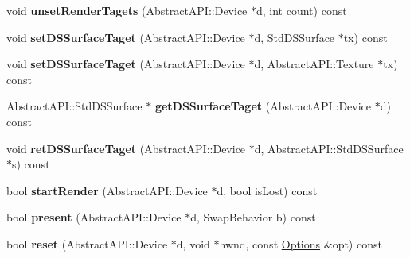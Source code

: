 \begin{DoxyCompactItemize}
\item 
\hypertarget{class_tempest_1_1_direct_x9_a0de8c9bc2b57107919436b5ede1e86af}{void {\bfseries unset\+Render\+Tagets} (Abstract\+A\+P\+I\+::\+Device $\ast$d, int count) const }\label{class_tempest_1_1_direct_x9_a0de8c9bc2b57107919436b5ede1e86af}

\item 
\hypertarget{class_tempest_1_1_direct_x9_a22ad8d6d5d3a21ca2bfee5fac260140a}{void {\bfseries set\+D\+S\+Surface\+Taget} (Abstract\+A\+P\+I\+::\+Device $\ast$d, Std\+D\+S\+Surface $\ast$tx) const }\label{class_tempest_1_1_direct_x9_a22ad8d6d5d3a21ca2bfee5fac260140a}

\item 
\hypertarget{class_tempest_1_1_direct_x9_a66e60b211e993e9d5f811d0f33075670}{void {\bfseries set\+D\+S\+Surface\+Taget} (Abstract\+A\+P\+I\+::\+Device $\ast$d, Abstract\+A\+P\+I\+::\+Texture $\ast$tx) const }\label{class_tempest_1_1_direct_x9_a66e60b211e993e9d5f811d0f33075670}

\item 
\hypertarget{class_tempest_1_1_direct_x9_a2a15e9532b6a146569ddcc99e142b5ab}{Abstract\+A\+P\+I\+::\+Std\+D\+S\+Surface $\ast$ {\bfseries get\+D\+S\+Surface\+Taget} (Abstract\+A\+P\+I\+::\+Device $\ast$d) const }\label{class_tempest_1_1_direct_x9_a2a15e9532b6a146569ddcc99e142b5ab}

\item 
\hypertarget{class_tempest_1_1_direct_x9_ad3fe197c12fdc09ce025df3a066cb39b}{void {\bfseries ret\+D\+S\+Surface\+Taget} (Abstract\+A\+P\+I\+::\+Device $\ast$d, Abstract\+A\+P\+I\+::\+Std\+D\+S\+Surface $\ast$s) const }\label{class_tempest_1_1_direct_x9_ad3fe197c12fdc09ce025df3a066cb39b}

\item 
\hypertarget{class_tempest_1_1_direct_x9_af68144c80b9527f9f100ddf83dfcd8e4}{bool {\bfseries start\+Render} (Abstract\+A\+P\+I\+::\+Device $\ast$d, bool is\+Lost) const }\label{class_tempest_1_1_direct_x9_af68144c80b9527f9f100ddf83dfcd8e4}

\item 
\hypertarget{class_tempest_1_1_direct_x9_adf14e80a3109bdc2198a49b937778bec}{bool {\bfseries present} (Abstract\+A\+P\+I\+::\+Device $\ast$d, Swap\+Behavior b) const }\label{class_tempest_1_1_direct_x9_adf14e80a3109bdc2198a49b937778bec}

\item 
\hypertarget{class_tempest_1_1_direct_x9_aecdf7c4afd9287eb8ed1bbcf91453d7d}{bool {\bfseries reset} (Abstract\+A\+P\+I\+::\+Device $\ast$d, void $\ast$hwnd, const \hyperlink{struct_tempest_1_1_abstract_a_p_i_1_1_options}{Options} \&opt) const }\label{class_tempest_1_1_direct_x9_aecdf7c4afd9287eb8ed1bbcf91453d7d}


\end{DoxyCompactItemize}
